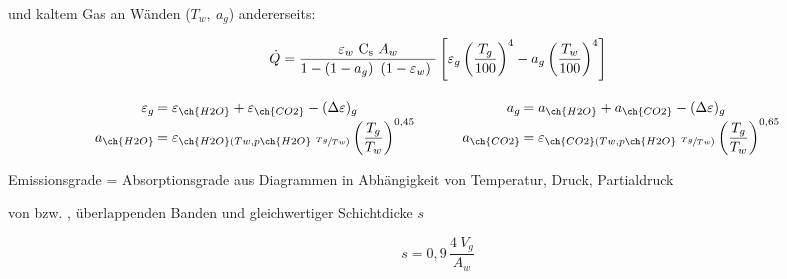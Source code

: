 	und kaltem Gas an Wänden ($ T_w,\ a_g $) andererseits:

	\skipabove{0pt}
	\[ \dot{Q} = \dfrac{\varepsilon_w\ \Cs\ A_w}{1-\left(1-a_g\right)\ (1-\varepsilon_w)\ } \left[ \varepsilon_g \left( \dfrac{T_g}{100} \right)^4 - a_g \left( \dfrac{T_w}{100} \right)^4 \right] \]

	\[ \arraycolsep=0.1em  \def\arraystretch{1.3}
	\begin{array}{r l p{3em} r l}
		\varepsilon_g & = \varepsilon_{\ch{H2O}} + \varepsilon_{\ch{CO2}} - (\Delta\varepsilon)_g                           &  & a_g           & = a_{\ch{H2O}} + a_{\ch{CO2}} - (\Delta \varepsilon)_g                                              \\
		a _{\ch{H2O}} & = \varepsilon_{ \ch{H2O} ( Tw , p \ch{H2O}\ \sfrac{Tg}{Tw})}  \left(\dfrac{T_g}{T_w}\right) ^{0,45} &  & a _{\ch{CO2}} & = \varepsilon_{ \ch{CO2} ( Tw , p \ch{H2O}\ \sfrac{Tg}{Tw})}  \left(\dfrac{T_g}{T_w}\right) ^{0,65}
	\end{array}\]



	Emissionsgrade = Absorptionsgrade aus Diagrammen in Abhängigkeit von Temperatur, Druck, Partialdruck

	von  bzw. , überlappenden Banden und gleichwertiger Schichtdicke $ s $

	\[ s= 0,9\, \dfrac{4\ V_g}{A_w} \]



